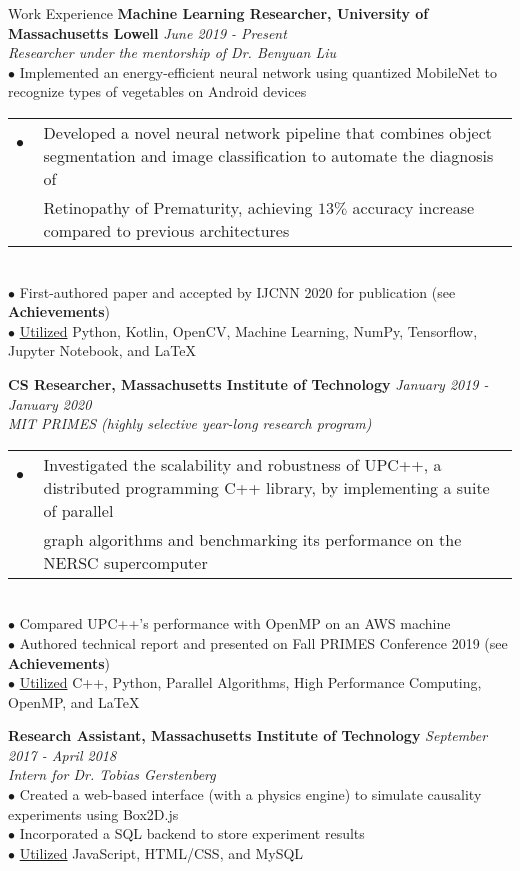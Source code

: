 \documentclass{resume} %
\begin{document}
\begin{rSection}{Work Experience}
{\bf Machine Learning Researcher, University of Massachusetts Lowell} \hfill {\em June 2019 - Present}
\\{\textit{Researcher under the mentorship of Dr. Benyuan Liu}}
\\$\bullet$ Implemented an energy-efficient neural network using quantized MobileNet to recognize types of vegetables on Android devices
\begin{tabular}{@{}l@{}l@{}}
    $\bullet$~ & Developed a novel neural network pipeline that combines object segmentation and image classification to automate the diagnosis of \\
    & Retinopathy of Prematurity, achieving $13\%$ accuracy increase compared to previous architectures \\
\end{tabular} 
\\$\bullet$ First-authored paper and accepted by IJCNN 2020 for publication {\small (see \textbf{Achievements})}
\\$\bullet$ \underline{Utilized} Python, Kotlin, OpenCV, Machine Learning, NumPy,  Tensorflow, Jupyter Notebook, and LaTeX

{\bf CS Researcher, Massachusetts Institute of Technology} \hfill {\em January 2019 - January 2020} 
\\{\textit{MIT PRIMES (highly selective year-long research program)}}
\\
\begin{tabular}{@{}l@{}l@{}}
    $\bullet$~ & Investigated the scalability and robustness of UPC++, a distributed programming C++ library, by implementing a suite of parallel \\ 
    & graph algorithms and benchmarking its performance on the NERSC supercomputer \\
\end{tabular} 
\\$\bullet$ Compared UPC++'s performance with OpenMP on an AWS machine
\\$\bullet$ Authored technical report and presented on Fall PRIMES Conference 2019 {\small (see \textbf{Achievements})}
\\$\bullet$ \underline{Utilized} C++, Python, Parallel Algorithms, High Performance Computing, OpenMP, and LaTeX

{\bf Research Assistant, Massachusetts Institute of Technology} \hfill {\em September 2017 - April 2018} 
\\{\textit{Intern for Dr. Tobias Gerstenberg}}
\\$\bullet$ Created a web-based interface (with a physics engine) to simulate causality experiments using Box2D.js
\\$\bullet$ Incorporated a SQL backend to store experiment results
\\$\bullet$ \underline{Utilized} JavaScript, HTML/CSS, and MySQL

\end{rSection}
\end{document}
